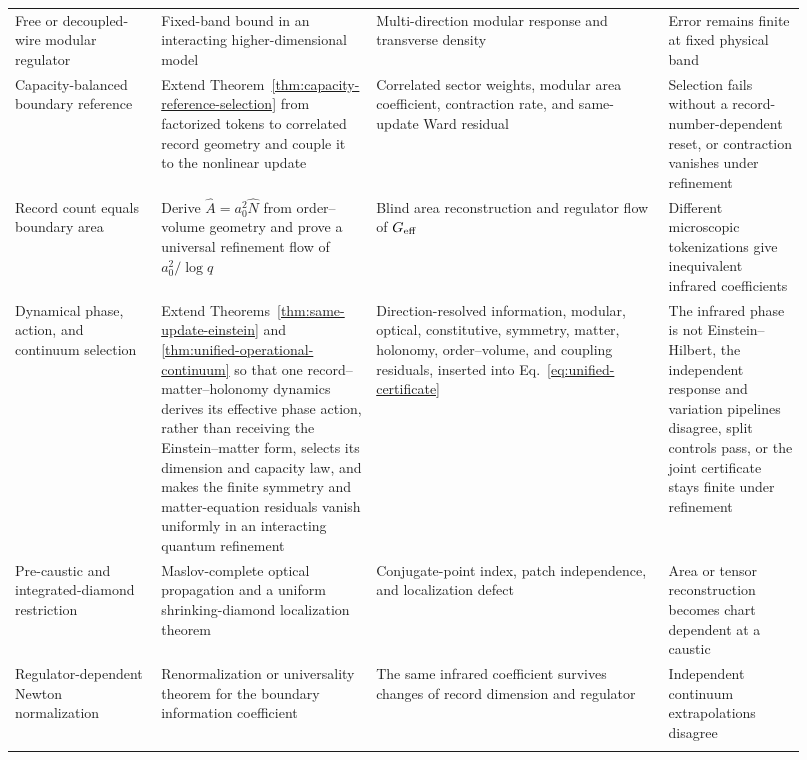 \begin{landscape}
\begin{longtable}{@{}P{0.17\linewidth}P{0.25\linewidth}
P{0.34\linewidth}P{0.16\linewidth}@{}}
\addlinespace
Free or decoupled-wire modular regulator
& Fixed-band bound in an interacting higher-dimensional model
& Multi-direction modular response and transverse density
& Error remains finite at fixed physical band\\
\addlinespace
Capacity-balanced boundary reference
& Extend Theorem~\ref{thm:capacity-reference-selection} from factorized tokens
  to correlated record geometry and couple it to the nonlinear update
& Correlated sector weights, modular area coefficient, contraction rate, and
  same-update Ward residual
& Selection fails without a record-number-dependent reset, or contraction
  vanishes under refinement\\
\addlinespace
Record count equals boundary area
& Derive \(\widehat A=a_0^2\widehat N\) from order--volume geometry and prove
  a universal refinement flow of \(a_0^2/\log q\)
& Blind area reconstruction and regulator flow of \(G_{\rm eff}\)
& Different microscopic tokenizations give inequivalent infrared
  coefficients\\
\addlinespace
Dynamical phase, action, and continuum selection
& Extend Theorems~\ref{thm:same-update-einstein} and
  \ref{thm:unified-operational-continuum} so that one
  record--matter--holonomy dynamics derives its effective phase action,
  rather than receiving the Einstein--matter form, selects its dimension and
  capacity law, and makes the finite symmetry and matter-equation residuals
  vanish uniformly in an interacting quantum refinement
& Direction-resolved information, modular, optical, constitutive, symmetry,
  matter, holonomy, order--volume, and coupling residuals, inserted into
  Eq.~\eqref{eq:unified-certificate}
& The infrared phase is not Einstein--Hilbert, the independent response and
  variation pipelines disagree, split controls pass, or the joint
  certificate stays finite under refinement\\
\addlinespace
Pre-caustic and integrated-diamond restriction
& Maslov-complete optical propagation and a uniform shrinking-diamond
  localization theorem
& Conjugate-point index, patch independence, and localization defect
& Area or tensor reconstruction becomes chart dependent at a caustic\\
\addlinespace
Regulator-dependent Newton normalization
& Renormalization or universality theorem for the boundary information
  coefficient
& The same infrared coefficient survives changes of record dimension and
  regulator
& Independent continuum extrapolations disagree\\
\addlinespace

\end{longtable}
\end{landscape}
